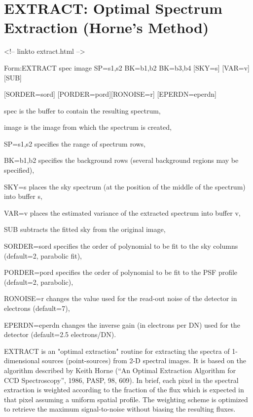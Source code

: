 \section{EXTRACT: Optimal Spectrum Extraction (Horne's Method)}
\begin{rawhtml}
<!-- linkto extract.html -->
\end{rawhtml}
\begin{command}
  \item[Form:EXTRACT spec image SP=s1,s2 BK=b1,b2 BK=b3,b4 {[SKY=s]} 
       {[VAR=v]} {[SUB]}\hfill]{}
  \item[{[SORDER=sord]} {[PORDER=pord]}{[RONOISE=r]} 
        {[EPERDN=eperdn]} \hfill]{}
  \item[spec\hfill]{is the buffer to contain the resulting spectrum,}
  \item[image\hfill]{is the image from which the spectrum is created,}
  \item[SP=s1,s2\hfill]{specifies the range of spectrum rows,}
  \item[BK=b1,b2\hfill]{specifies the background rows (several background
       regions may be specified),}
  \item[SKY=s\hfill]{places the sky spectrum (at the position of the
       middle of the spectrum) into buffer s,}
  \item[VAR=v\hfill]{places the estimated variance of the extracted
       spectrum into buffer v,}
  \item[SUB\hfill]{subtracts the fitted sky from the original image,}
  \item[SORDER=sord\hfill]{specifies the order of polynomial to be fit to the
       sky columns (default=2, parabolic fit),}
  \item[PORDER=pord\hfill]{specifies the order of polynomial to be fit to the
       PSF profile (default=2, parabolic),}
  \item[RONOISE=r\hfill]{changes the value used for the read-out noise of the
       detector in electrons (default=7),}
  \item[EPERDN=eperdn\hfill]{changes the inverse gain (in electrons per DN) 
       used for the detector (default=2.5 electrons/DN).}
\end{command}

EXTRACT is an "optimal extraction" routine for extracting the spectra of
1-dimensional sources (point-sources) from 2-D spectral images.  It is
based on the algorithm described by Keith Horne (``An Optimal Extraction
Algorithm for CCD Spectroscopy'', 1986, PASP, 98, 609).  In brief, each
pixel in the spectral extraction is weighted according to the fraction of
the flux which is expected in that pixel assuming a uniform spatial
profile.  The weighting scheme is optimized to retrieve the maximum
signal-to-noise without biasing the resulting fluxes. 

